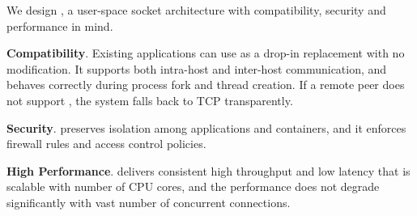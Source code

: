 



We design \sys{}, a user-space socket architecture with compatibility, security and performance in mind.
\begin{ecompact}
	\item \textbf{Compatibility}.
	Existing applications can use \sys{} as a drop-in replacement with no modification.
	It supports both intra-host and inter-host communication, and behaves correctly during process fork and thread creation.
	If a remote peer does not support \sys{}, the system falls back to TCP transparently.
	\item \textbf{Security}.
	\sys{} preserves isolation among applications and containers, and it enforces firewall rules and access control policies.
	\item \textbf{High Performance}.
	\sys{} delivers consistent high throughput and low latency that is scalable with number of CPU cores, and the performance does not degrade significantly with vast number of concurrent connections.
\end{ecompact}



